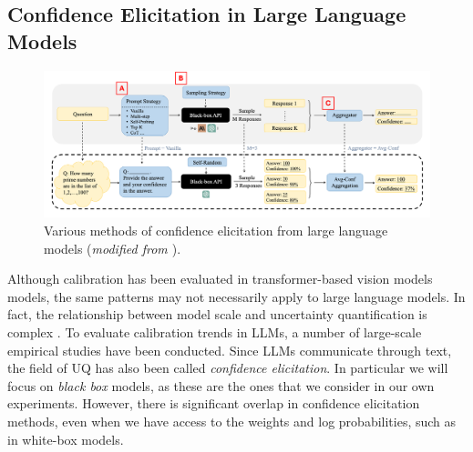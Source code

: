 \subsection{Confidence Elicitation in Large Language Models} \label{subchapter:conf-elicitation}

\begin{figure}[htbp]
	\centering
	\includegraphics[width=1\linewidth] {figures/conf_elicit_llms.png}
	\caption{Various methods of confidence elicitation from large language models (\emph{modified from \citet{xiong2024can}}).} \label{fig:conf-elicit-llms}
\end{figure}


Although calibration has been evaluated in transformer-based vision models models, the same patterns may not necessarily apply to large language models. In fact, the relationship between model scale and uncertainty quantification is complex \citep{ye2024llm_uq}. To evaluate calibration trends in LLMs, a number of large-scale empirical studies have been conducted. Since LLMs communicate through text, the field of UQ has also been called \emph{confidence elicitation}. In particular we will focus on \emph{black box} models, as these are the ones that we consider in our own experiments. However, there is significant overlap in confidence elicitation methods, even when we have access to the weights and log probabilities, such as in white-box models. 

